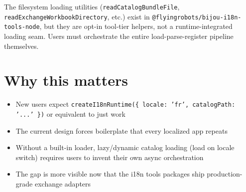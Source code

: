 The filesystem loading utilities (\texttt{r\allowbreak{}e\allowbreak{}a\allowbreak{}d\allowbreak{}C\allowbreak{}a\allowbreak{}t\allowbreak{}a\allowbreak{}l\allowbreak{}o\allowbreak{}g\allowbreak{}B\allowbreak{}u\allowbreak{}n\allowbreak{}d\allowbreak{}l\allowbreak{}e\allowbreak{}F\allowbreak{}i\allowbreak{}l\allowbreak{}e}, \texttt{r\allowbreak{}e\allowbreak{}a\allowbreak{}d\allowbreak{}E\allowbreak{}x\allowbreak{}c\allowbreak{}h\allowbreak{}a\allowbreak{}n\allowbreak{}g\allowbreak{}e\allowbreak{}W\allowbreak{}o\allowbreak{}r\allowbreak{}k\allowbreak{}b\allowbreak{}o\allowbreak{}o\allowbreak{}k\allowbreak{}D\allowbreak{}i\allowbreak{}r\allowbreak{}e\allowbreak{}c\allowbreak{}t\allowbreak{}o\allowbreak{}r\allowbreak{}y}, etc.) exist in \texttt{@\allowbreak{}f\allowbreak{}l\allowbreak{}y\allowbreak{}i\allowbreak{}n\allowbreak{}g\allowbreak{}r\allowbreak{}o\allowbreak{}b\allowbreak{}o\allowbreak{}t\allowbreak{}s\allowbreak{}/\allowbreak{}b\allowbreak{}i\allowbreak{}j\allowbreak{}o\allowbreak{}u\allowbreak{}-\allowbreak{}i\allowbreak{}1\allowbreak{}8\allowbreak{}n\allowbreak{}-\allowbreak{}t\allowbreak{}o\allowbreak{}o\allowbreak{}l\allowbreak{}s\allowbreak{}-\allowbreak{}n\allowbreak{}o\allowbreak{}d\allowbreak{}e}, but they are opt-in tool-tier helpers, not a runtime-integrated loading seam. Users must orchestrate the entire load-parse-register pipeline themselves.

\section{Why this matters}\label{record-358-why-this-matters}

\begin{itemize}
\tightlist
\item
  New users expect \texttt{c\allowbreak{}r\allowbreak{}e\allowbreak{}a\allowbreak{}t\allowbreak{}e\allowbreak{}I\allowbreak{}1\allowbreak{}8\allowbreak{}n\allowbreak{}R\allowbreak{}u\allowbreak{}n\allowbreak{}t\allowbreak{}i\allowbreak{}m\allowbreak{}e\allowbreak{}(\allowbreak{}\{\allowbreak{} \allowbreak{}l\allowbreak{}o\allowbreak{}c\allowbreak{}a\allowbreak{}l\allowbreak{}e\allowbreak{}:\allowbreak{} \allowbreak{}'\allowbreak{}f\allowbreak{}r\allowbreak{}'\allowbreak{},\allowbreak{} \allowbreak{}c\allowbreak{}a\allowbreak{}t\allowbreak{}a\allowbreak{}l\allowbreak{}o\allowbreak{}g\allowbreak{}P\allowbreak{}a\allowbreak{}t\allowbreak{}h\allowbreak{}:\allowbreak{} \allowbreak{}'\allowbreak{}.\allowbreak{}.\allowbreak{}.\allowbreak{}'\allowbreak{} \allowbreak{}\}\allowbreak{})} or equivalent to just work
\item
  The current design forces boilerplate that every localized app repeats
\item
  Without a built-in loader, lazy/dynamic catalog loading (load on locale switch) requires users to invent their own async orchestration
\item
  The gap is more visible now that the i18n tools packages ship production-grade exchange adapters
\end{itemize}

